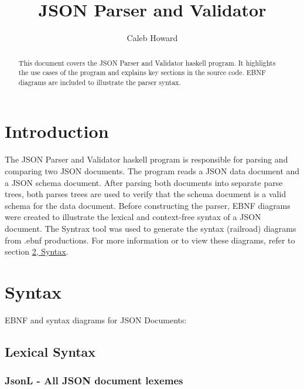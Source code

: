 \documentclass[a4paper]{article}
\begin{document}
\title{JSON Parser and Validator}

\author{Caleb Howard}

\maketitle

\begin{abstract}
   \noindent This document covers the JSON Parser and Validator haskell program. It highlights the
   use cases of the program and explains key sections in the source code. EBNF diagrams are included 
   to illustrate the parser syntax.
\end{abstract}

\section{Introduction}

The JSON Parser and Validator haskell program is responsible for parsing and comparing two JSON documents.
The program reads a JSON data document and a JSON schema document.
After parsing both documents into separate parse trees, both parses trees are used to 
verify that the schema document is a valid schema for the data document. \newline
Before constructing the parser, EBNF diagrams were created to illustrate the lexical and context-free
syntax of a JSON document. The Syntrax tool was used to generate the syntax (railroad) diagrams from
.ebnf productions. For more information or to view these diagrams, refer to section \hyperref[sec:syntax]{2, Syntax}.


\section{Syntax}
\label{sec:syntax}

EBNF and syntax diagrams for JSON Documents:

\subsection{Lexical Syntax}

\subsubsection{JsonL - All JSON document lexemes}
\end{document}
